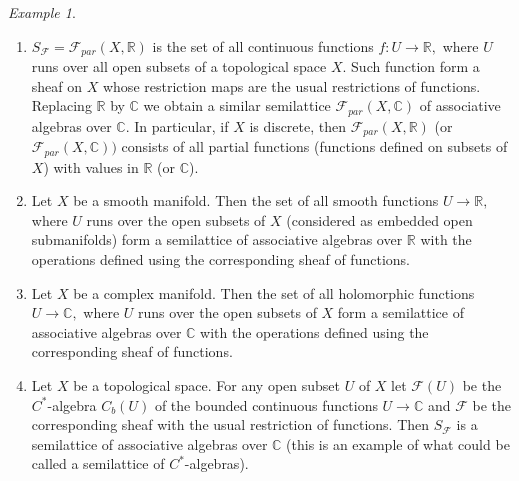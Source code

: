 \documentclass[10pt,a4paper]{amsart}
\theoremstyle{definition}
\theoremstyle{remark}
\newtheorem{ex}[thm]{Example}
\numberwithin{equation}{section}
\newtheorem*{Theorem A}{\textbf{Theorem A}}
\newtheorem*{Corollary E}{\textbf{Corollary E}}
\newtheorem*{Corollary F}{\textbf{Corollary F}}
\newtheorem*{Theorem B}{\textbf{Theorem B}}
\newtheorem*{Theorem C}{\textbf{Theorem C}}
\newtheorem*{Theorem D}{\textbf{Theorem B}}
\newtheorem*{p a}{\textbf{Proof of  Theorem A}}
\newtheorem*{p b}{\textbf{Proof of Theorem B}}
\newtheorem*{p c}{\textbf{Proof of  Theorem C}}
\newtheorem*{p d}{\textbf{Proof of  Theorem D}}
\newcommand{\R}{\mathbb{R}}
\newcommand{\C}{\mathbb{C}}
\newcommand{\0}{{\vartheta}}
\begin{document}
\begin{ex}
\begin{enumerate}
\item 
$S_{\mathcal F}= {\mathcal F}_{par}(X,\R )$ is the set 
 of all continuous functions $f:U\to \R,$ where $U$ runs over all open subsets of a topological space $X.$ Such function form a sheaf on $X$ whose restriction maps are the usual restrictions of functions. 
 Replacing $\R$ by $\C$ we obtain a similar semilattice ${\mathcal F}_{par}(X,\C )$ of associative algebras over $\C .$ In particular, if $X$ is discrete, then ${\mathcal F}_{par}(X,\R )$ (or  ${\mathcal F}_{par}(X,\C ))$ consists of all partial functions (functions defined on subsets of $X$) with values in $\R$ (or $\C$). \\
 

\item Let $X$ be a smooth manifold. Then the set of all smooth functions $U \to \R,$ where $U$ runs over the open subsets of $X$ (considered as embedded open submanifolds) form  a semilattice of associative algebras over $\R$ with the operations defined using the corresponding sheaf of functions.\\



\item Let $X$ be a complex manifold. Then the set of all holomorphic  functions $U \to \C,$ where $U$ runs over the open subsets of $X$ form  a semilattice of associative algebras over $\C$ with the operations defined using the corresponding sheaf of functions.\\

\item Let $X$ be a topological space. For any open subset $U$ of $X$ let ${\mathcal F} (U) $ be the $C^*$-algebra   $C_b(U )$ of the   bounded continuous functions $U\to \C$ and ${\mathcal F} $ be the corresponding sheaf with the usual restriction of functions. Then $S_{\mathcal F}$ is  a semilattice of associative algebras over $\C$  (this is an example of what could be called a semilattice of $C^*$-algebras).\\


\end{enumerate}
\end{ex}
\end{document}
